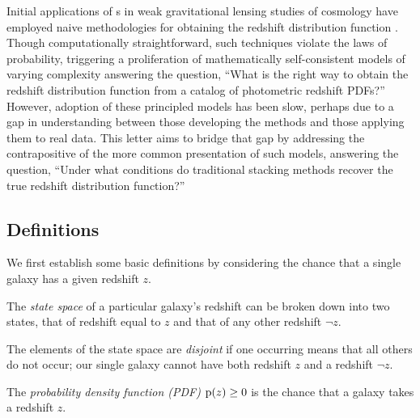 
Initial applications of \pzpdf s in weak gravitational lensing studies of cosmology have employed naive methodologies for obtaining the redshift distribution function \Nz.
Though computationally straightforward, such techniques violate the laws of probability, triggering a proliferation of mathematically self-consistent models of varying complexity answering the question, ``What is the right way to obtain the redshift distribution function from a catalog of photometric redshift PDFs?''
However, adoption of these principled models has been slow, perhaps due to a gap in understanding between those developing the methods and those applying them to real data.
This letter aims to bridge that gap by addressing the contrapositive of the more common presentation of such models, answering the question, ``Under what conditions do traditional stacking methods recover the true redshift distribution function?''

\subsection{Definitions}

We first establish some basic definitions by considering the chance that a single galaxy has a given redshift $z$.

\begin{definition}\label{def:binarystatespace}
	The \textit{state space} of a particular galaxy's redshift can be broken down into two states, that of redshift equal to $z$ and that of any other redshift $\lnot z$.
\end{definition}

\begin{definition}\label{def:disjoint}
	The elements of the state space are \textit{disjoint} if one occurring means that all others do not occur; our single galaxy cannot have both redshift $z$ and a redshift $\lnot z$.
\end{definition}

\begin{definition}\label{def:pdens}
	The \textit{probability density function (PDF)} $\mathrm{p}(z) \geq 0$ is the chance that a galaxy takes a redshift $z$.
\end{definition}

